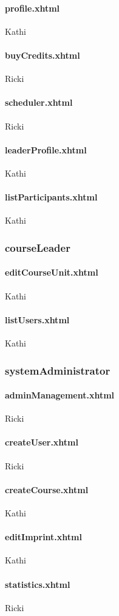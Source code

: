 				\paragraph{profile.xhtml}
				Kathi
				
				\paragraph{buyCredits.xhtml}
				Ricki
				
				\paragraph{scheduler.xhtml}
				Ricki
				
				\paragraph{leaderProfile.xhtml}
				Kathi
				
				\paragraph{listParticipants.xhtml}
				Kathi
			
			\subsubsection{courseLeader}
			
				\paragraph{editCourseUnit.xhtml}
				Kathi
				
				\paragraph{listUsers.xhtml}
				Kathi
			
			\subsubsection{systemAdministrator}
			
				\paragraph{adminManagement.xhtml}
				Ricki
				
				\paragraph{createUser.xhtml}
				Ricki
				
				\paragraph{createCourse.xhtml}
				Kathi
				
				\paragraph{editImprint.xhtml}
				Kathi
				
				\paragraph{statistics.xhtml}
				Ricki